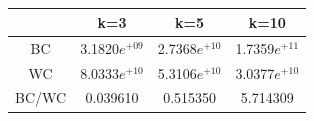 \documentclass[12pt,a4paper]{report}
\begin{document}
	\subsection{}
	\begin{tabular}{|c|c|c|c|}
	\hline
	&k=3&k=5&k=10\\
	\hline
	BC&3.1820$e^{+09}$&2.7368$e^{+10}$&1.7359$e^{+11}$\\
	WC&8.0333$e^{+10}$&5.3106$e^{+10}$&3.0377$e^{+10}$\\
	BC/WC&0.039610&0.515350&5.714309\\
	\hline
	\end{tabular}
\end{document}
